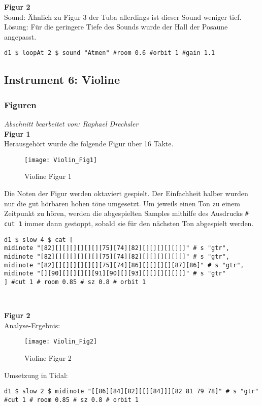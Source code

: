 \documentclass[
10pt, %
a4paper, %
oneside, %
headinclude,footinclude, %
BCOR5mm, %
]{scrartcl}
\begin{document}
\noindent\textbf{Figur 2}\\
Sound: Ähnlich zu Figur 3 der Tuba allerdings ist dieser Sound weniger tief.\\
Lösung: Für die geringere Tiefe des Sounds wurde der Hall der Posaune angepasst.
\begin{lstlisting}
d1 $ loopAt 2 $ sound "Atmen" #room 0.6 #orbit 1 #gain 1.1
\end{lstlisting}

\subsection{Instrument 6: Violine}
\subsubsection{Figuren}
\textit{Abschnitt bearbeitet von: Raphael Drechsler}\\

\noindent\textbf{Figur 1}\\
Herausgehört wurde die folgende Figur über 16 Takte.
\begin{figure}[h]
	\centering 
	\texttt{[image: Violin\_Fig1]} 
	\caption{Violine Figur 1}
\end{figure}

\noindent Die Noten der Figur werden oktaviert gespielt. Der Einfachheit halber wurden nur die gut hörbaren hohen töne umgesetzt. Um jeweils einen Ton zu einem Zeitpunkt zu hören, werden die abgespielten Samples mithilfe des Ausdrucks \verb|# cut 1| immer dann gestoppt, sobald sie für den nächsten Ton abgespielt werden.\cite{tid12}

\begin{lstlisting}
d1 $ slow 4 $ cat [
midinote "[82][][][][][][][75][74][82][][][][][][]" # s "gtr",
midinote "[82][][][][][][][75][74][82][][][][][][]" # s "gtr",
midinote "[82][][][][][][][75][74][86][][][][][87][86]" # s "gtr",
midinote "[][90][][][][][91][90][][93][][][][][][]" # s "gtr"
] #cut 1 # room 0.85 # sz 0.8 # orbit 1 
\end{lstlisting}\

\noindent\textbf{Figur 2}\\
Analyse-Ergebnis:
\begin{figure}[h]
	\centering 
	\texttt{[image: Violin\_Fig2]} 
	\caption{Violine Figur 2}
\end{figure}

\noindent Umsetzung in Tidal:
\begin{lstlisting}
d1 $ slow 2 $ midinote "[[86][84][82][[][84]]][82 81 79 78]" # s "gtr" #cut 1 # room 0.85 # sz 0.8 # orbit 1
\end{lstlisting}
\end{document}
